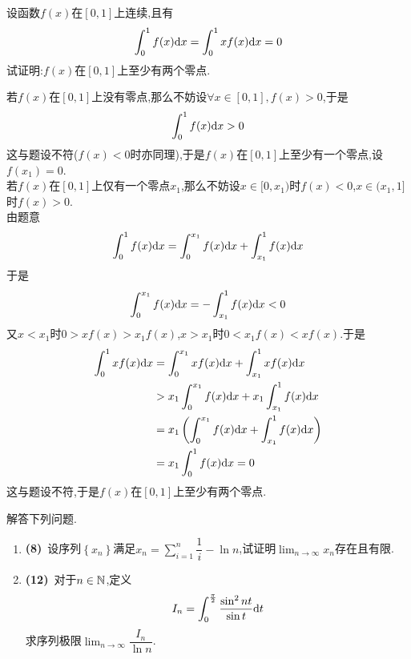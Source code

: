 \documentclass{ctexart}
\begin{document}
\begin{problem}[6.(10\songti 分)]
    设函数$f(x)$在$[0,1]$上连续,且有$$\int_0^1f(x)\mathrm{d} x=\int_0^1xf(x)\mathrm{d} x=0$$试证明:$f(x)$在$[0,1]$上至少有两个零点.
\end{problem}
\begin{solution}[Proof.]
    若$f(x)$在$[0,1]$上没有零点,那么不妨设$\forall x\in[0,1],f(x)>0$,于是
    $$\int_{0}^{1}f(x)\mathrm{d} x>0$$
    这与题设不符($f(x)<0$时亦同理),于是$f(x)$在$[0,1]$上至少有一个零点,设$f(x_1)=0$.\\
    若$f(x)$在$[0,1]$上仅有一个零点$x_1$,那么不妨设$x\in[0,x_1)$时$f(x)<0$,$x\in(x_1,1]$时$f(x)>0$.\\
    由题意$$\int_0^1f(x)\mathrm{d} x=\int_0^{x_1}f(x)\mathrm{d} x+\int_{x_1}^1f(x)\mathrm{d} x$$
    于是$$\int_0^{x_1}f(x)\mathrm{d} x=-\int_{x_1}^1f(x)\mathrm{d} x<0$$
    又$x<x_1$时$0>xf(x)>x_1f(x)$,$x>x_1$时$0<x_1f(x)<xf(x)$.于是
    $$\begin{aligned}
        \int_0^1xf(x)\mathrm{d} x
        &= \int_0^{x_1}xf(x)\mathrm{d} x+\int_{x_1}^{1}xf(x)\mathrm{d} x \\
        &> x_1\int_0^{x_1}f(x)\mathrm{d} x+x_1\int_{x_1}^1f(x)\mathrm{d} x \\
        &= x_1\left(\int_0^{x_1}f(x)\mathrm{d} x+\int_{x_1}^1f(x)\mathrm{d} x\right) \\
        &= x_1\int_0^1f(x)\mathrm{d} x =0
    \end{aligned}$$
    这与题设不符,于是$f(x)$在$[0,1]$上至少有两个零点.
\end{solution}
\begin{problem}[7.(20\songti 分)]
    解答下列问题.
    \begin{enumerate}[label=\textbf{(\arabic*)}]
        \item \textbf{(8)}\ 设序列$\left\{x_n\right\}$满足$\displaystyle x_n=\sum_{i=1}^n\dfrac{1}{i}-\ln n$,试证明$\displaystyle\lim_{n\to\infty}x_n$存在且有限.
        \item \textbf{(12)}\ 对于$n\in\mathbb{N}$,定义$$I_n=\int_0^\frac{\pi}{2}\dfrac{\sin^2nt}{\sin t}\mathrm{d} t$$求序列极限$\displaystyle\lim_{n\to\infty}\dfrac{I_n}{\ln n}$.
    \end{enumerate}
\end{problem}
\end{document}

